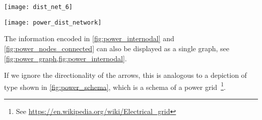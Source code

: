 \begin{figure*}[h!]
  \centering
  \caption{Connectivity between high voltage nodes.}
  \label{fig:power_internodal}
\end{figure*}

\begin{marginfigure}
  \centering
  \texttt{[image: dist\_net\_6]}
  \caption{Alternative visualization for connectivity.}
  \label{fig:power_graph}
\end{marginfigure}

\begin{marginfigure}
  \centering
  \texttt{[image: power\_dist\_network]}
  \caption{A schematic view of a power grid.}
  \label{fig:power_schema}
\end{marginfigure}


The information encoded in \cref{fig:power_internodal} and \cref{fig:power_nodes_connected} can also be displayed as a single graph, see \cref{fig:power_graph,fig:power_internodal}.


If we ignore the directionality of the arrows, this is analogous to a depiction of type shown in \cref{fig:power_schema}, which is a schema of a power grid~\cite{Cuffe17}\footnote{See \url{https://en.wikipedia.org/wiki/Electrical_grid}}.

